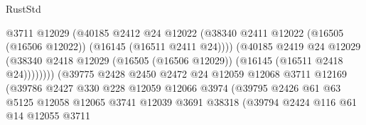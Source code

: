 \begin{lexlean}{RustStd}
\begin{coremodule}
                                          @3711
                                          @12029
                                          (@40185
                                            @2412
                                            @24
                                            @12022
                                            (@38340
                                              @2411
                                              @12022
                                              (@16505 (@16506 @12022))
                                              (@16145 (@16511 @2411 @24))))
                                          (@40185
                                            @2419
                                            @24
                                            @12029
                                            (@38340
                                              @2418
                                              @12029
                                              (@16505 (@16506 @12029))
                                              (@16145 (@16511 @2418 @24))))))))
                                  (@39775
                                    @2428
                                    @2450
                                    @2472
                                    @24
                                    @12059
                                    @12068
                                    @3711
                                    @12169
                                    (@39786
                                      @2427
                                      @330
                                      @228
                                      @12059
                                      @12066
                                      @3974
                                      (@39795
                                        @2426
                                        @61
                                        @63
                                        @5125
                                        @12058
                                        @12065
                                        @3741
                                        @12039
                                        @3691
                                        @38318
                                        (@39794
                                          @2424
                                          @116
                                          @61
                                          @14
                                          @12055
                                          @3711

\end{coremodule}
\end{lexlean}
